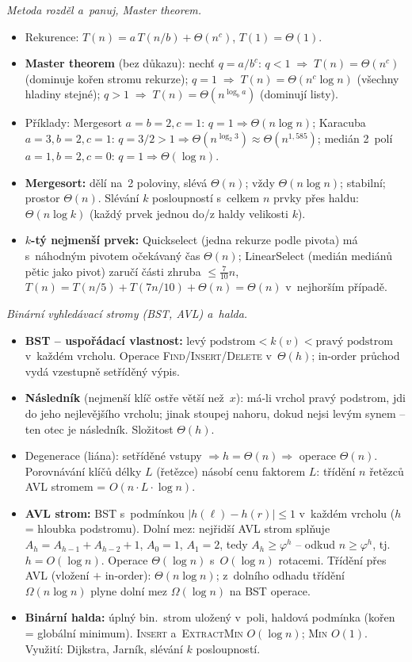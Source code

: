 \documentclass[11pt,a4paper]{article}
\begin{document}
\begin{poznamka}
\smallskip
\emph{Metoda rozděl a~panuj, Master theorem.}
\begin{itemize}
  \item Rekurence: $T(n)=a\,T(n/b)+\Theta(n^c)$, $T(1)=\Theta(1)$.
  \item \textbf{Master theorem} (bez důkazu): nechť $q=a/b^c$:
    $q<1\;\Rightarrow\;T(n)=\Theta(n^c)$ (dominuje kořen stromu rekurze);
    $q=1\;\Rightarrow\;T(n)=\Theta(n^c\log n)$ (všechny hladiny stejné);
    $q>1\;\Rightarrow\;T(n)=\Theta(n^{\log_b a})$ (dominují listy).
  \item Příklady: Mergesort $a{=}b{=}2,c{=}1$: $q{=}1\Rightarrow\Theta(n\log n)$; Karacuba $a{=}3,b{=}2,c{=}1$: $q{=}3/2{>}1\Rightarrow\Theta(n^{\log_2 3})\approx\Theta(n^{1{,}585})$; medián 2~polí $a{=}1,b{=}2,c{=}0$: $q{=}1\Rightarrow\Theta(\log n)$.
  \item \textbf{Mergesort:} dělí na~2 poloviny, slévá $\Theta(n)$; vždy $\Theta(n\log n)$; stabilní; prostor $\Theta(n)$. Slévání $k$ posloupností s~celkem $n$ prvky přes haldu: $\Theta(n\log k)$ (každý prvek jednou do/z haldy velikosti $k$).
  \item \textbf{$k$-tý nejmenší prvek:} Quickselect (jedna rekurze podle pivota) má s~náhodným pivotem očekávaný čas $\Theta(n)$; LinearSelect (medián mediánů pětic jako pivot) zaručí části zhruba $\le\tfrac{7}{10}n$, $T(n)=T(n/5)+T(7n/10)+\Theta(n)=\Theta(n)$ v~nejhorším případě.
\end{itemize}

\smallskip
\emph{Binární vyhledávací stromy (BST, AVL) a~halda.}
\begin{itemize}
  \item \textbf{BST -- uspořádací vlastnost:} $\text{levý podstrom}<k(v)<\text{pravý podstrom}$ v~každém vrcholu. Operace \textsc{Find}/\textsc{Insert}/\textsc{Delete} v~$\Theta(h)$; in-order průchod vydá vzestupně setříděný výpis.
  \item \textbf{Následník} (nejmenší klíč ostře větší než~$x$): má-li vrchol pravý podstrom, jdi do jeho nejlevějšího vrcholu; jinak stoupej nahoru, dokud nejsi levým synem -- ten otec je následník. Složitost $\Theta(h)$.
  \item Degenerace (liána): setříděné vstupy $\Rightarrow h=\Theta(n)\Rightarrow$ operace $\Theta(n)$. Porovnávání klíčů délky $L$ (řetězce) násobí cenu faktorem $L$: třídění $n$ řetězců AVL stromem = $O(n\cdot L\cdot\log n)$.
  \item \textbf{AVL strom:} BST s~podmínkou $|h(\ell)-h(r)|\le1$ v~každém vrcholu ($h$ = hloubka podstromu). Dolní mez: nejřidší AVL strom splňuje $A_h=A_{h-1}+A_{h-2}+1$, $A_0=1$, $A_1=2$, tedy $A_h\ge\varphi^h$ -- odkud $n\ge\varphi^h$, tj.\ $h=O(\log n)$. Operace $\Theta(\log n)$ s~$O(\log n)$ rotacemi. Třídění přes AVL (vložení $+$ in-order): $\Theta(n\log n)$; z~dolního odhadu třídění $\Omega(n\log n)$ plyne dolní mez $\Omega(\log n)$ na BST operace.
  \item \textbf{Binární halda:} úplný bin.\ strom uložený v~poli, haldová podmínka (kořen = globální minimum). \textsc{Insert} a~\textsc{ExtractMin} $O(\log n)$; \textsc{Min} $O(1)$. Využití: Dijkstra, Jarník, slévání $k$ posloupností.
\end{itemize}


\end{poznamka}
\end{document}

